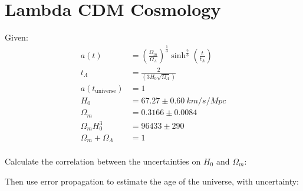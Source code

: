 \section{Lambda CDM Cosmology}
Given:
\begin{align*}
    a(t) &= \left(\frac{\Omega_m}{\Omega_\Lambda}\right)^\frac{1}{3} \sinh^{\frac{2}{3}}\left(\frac{t}{t_\Lambda}\right) \\
    t_\Lambda &= \frac{2}{\left(3H_0\sqrt{\Omega_\Lambda}\right)} \\
    a(t_{\text{universe}}) &= 1 \\
    H_0 &= 67.27 \pm \SI{0.60}{km/s/Mpc} \\
    \Omega_m &= 0.3166 \pm 0.0084 \\
    \Omega_m H_0^3 &= 96433 \pm 290 \\
    \Omega_m + \Omega_\Lambda &= 1 \\
\end{align*}

Calculate the correlation between the uncertainties on $H_0$ and $\Omega_m$:


Then use error propagation to estimate the age of the universe, with uncertainty:

